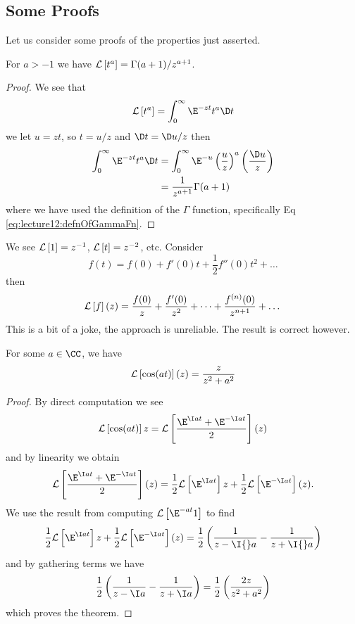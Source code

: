 \subsection{Some Proofs}
Let us consider some proofs of the properties just asserted.
\begin{prop}
For $a>-1$ we have
$\mathcal{L}\left[t^{a}\right]=\Gamma(a+1)/z^{a+1}$. 
\end{prop}
\begin{proof}
We see that
\begin{equation}
\laplace{t^{a}}=\int^{\infty}_{0}\E^{-zt}t^{a}\D t
\end{equation}
we let $u=zt$, so $t=u/z$ and $\D t=\D u/z$ then
\begin{equation}
\begin{split}
\int^{\infty}_{0}\E^{-zt}t^{a}\D t
&=\int^{\infty}_{0}\E^{-u}\left(\frac{u}{z}\right)^{a}\left(\frac{\D u}{z}\right)\\
&=\frac{1}{z^{a+1}}\Gamma(a+1)
\end{split}
\end{equation}
where we have used the definition of the $\Gamma$ function, specifically Eq \eqref{eq:lecture12:defnOfGammaFn}.
\end{proof}
\begin{ex}
We see $\mathcal{L}\left[1\right]=z^{-1}$, $\mathcal{L}\left[t\right]=z^{-2}$, etc. Consider
\begin{equation}
f(t)=f(0)+f'(0)t+\frac{1}{2}f''(0)t^{2}+\dots
\end{equation}
then
\begin{equation}
\mathcal{L}\left[f\right](z)=\frac{f(0)}{z}+\frac{f'(0)}{z^{2}}+\dots+\frac{f^{(n)}(0)}{z^{n+1}}+\dots
\end{equation}
This is a bit of a joke, the approach is unreliable. The result
is correct however.
\end{ex}
\begin{prop}
For some $a\in\CC$, we have
\begin{equation}
\mathcal{L}\left[\cos(at)\right](z) = \frac{z}{z^{2}+a^{2}}
\end{equation}
\end{prop}
\begin{proof}
By direct computation we see
\begin{equation}
\laplace{\cos(at)}{z}=\laplace{\frac{\E^{\I at}+\E^{-\I at}}{2}}(z)
\end{equation}
and by linearity we obtain
\begin{equation}
\laplace{\frac{\E^{\I at}+\E^{-\I at}}{2}}(z)=\frac{1}{2}\laplace{\E^{\I at}}{z}+\frac{1}{2}\laplace{\E^{-\I at}}(z).
\end{equation}
We use the result from computing $\laplace{\E^{-at}1}$ to find
\begin{equation}
\frac{1}{2}\laplace{\E^{\I at}}{z}+\frac{1}{2}\laplace{\E^{-\I at}}(z)=\frac{1}{2}\left(\frac{1}{z-\I{}a}-\frac{1}{z+\I{}a}\right)
\end{equation}
and by gathering terms we have
\begin{equation}
\frac{1}{2}\left(\frac{1}{z-\I a}-\frac{1}{z+\I a}\right)=\frac{1}{2}\left(\frac{2z}{z^{2}+a^{2}}\right)
\end{equation}
which proves the theorem.
\end{proof}
